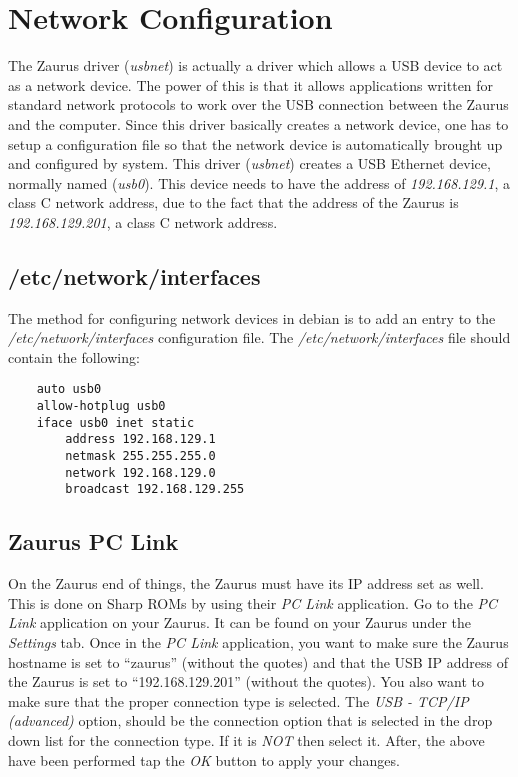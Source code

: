 \documentclass{article}
\begin{document}
\section{Network Configuration}

The Zaurus driver (\emph{usbnet}) is actually a driver which allows a
USB device to act as a network device. The power of this is that it
allows applications written for standard network protocols to work over
the USB connection between the Zaurus and the computer. Since this
driver basically creates a network device, one has to setup a
configuration file so that the network device is automatically brought
up and configured by system.  This driver (\emph{usbnet}) creates a USB
Ethernet device, normally named (\emph{usb0}).  This device needs to
have the address of \emph{192.168.129.1}, a class C network address, due
to the fact that the address of the Zaurus is \emph{192.168.129.201}, a
class C network address.

    \subsection{/etc/network/interfaces}

    The method for configuring network devices in debian is to add an
    entry to the \emph{/etc/network/interfaces} configuration file. The
    \emph{/etc/network/interfaces} file should contain the following:

    \begin{verbatim}
    auto usb0
    allow-hotplug usb0
    iface usb0 inet static
        address 192.168.129.1
        netmask 255.255.255.0
        network 192.168.129.0
        broadcast 192.168.129.255
    \end{verbatim}

    \subsection{Zaurus PC Link}

    On the Zaurus end of things, the Zaurus must have its IP address set as
    well. This is done on Sharp ROMs by using their \emph{PC Link}
    application. Go to the \emph{PC Link} application on your Zaurus. It can
    be found on your Zaurus under the \emph{Settings} tab. Once in the
    \emph{PC Link} application, you want to make sure the Zaurus hostname is
    set to ``zaurus'' (without the quotes) and that the USB IP address of the
    Zaurus is set to ``192.168.129.201'' (without the quotes). You also want
    to make sure that the proper connection type is selected. The \emph{USB -
    TCP/IP (advanced)} option, should be the connection option that is
    selected in the drop down list for the connection type. If it is
    \emph{NOT} then select it. After, the above have been performed tap the
    \emph{OK} button to apply your changes.
\end{document}
